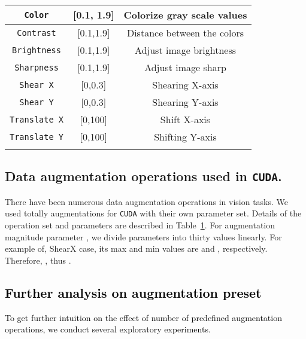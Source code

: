 \documentclass{article}
\def\code#1{\texttt{#1}}
\newcommand{\thickhline}{\hlineB{4}}
\newcommand{\alg}{\code{CUDA}\xspace}
\newcommand{\rebut}[1]{\textcolor{black}{#1}}
\begin{document}
\begin{table}[t!]
{\begin{tabular}{c|c|c}
\code{Color} 
& [0.1, 1.9]
& Colorize gray scale values\\ \hline


\code{Contrast} 
& [0.1,1.9]
& Distance between the colors\\ \hline


\code{Brightness} 
& [0.1,1.9]
& Adjust image brightness\\ \hline


\code{Sharpness} 
& [0.1,1.9]
& Adjust image sharp\\ \hline


\code{Shear X} 
& [0,0.3]
& Shearing X-axis\\ \hline


\code{Shear Y} 
& [0,0.3]
& Shearing Y-axis\\ \hline


\code{Translate X} 
& [0,100]
& Shift X-axis\\ \hline


\code{Translate Y} 
& [0,100]
& Shifting Y-axis\\ \hline


\thickhline
\end{tabular}
}\label{tab:aug_description}
\end{table}
 \subsection{Data augmentation operations used in \alg.}
There have been numerous data augmentation operations in vision tasks. We used totally  augmentations for \alg with their own parameter set. Details of the operation set and parameters are described in Table~\ref{tab:aug_description}.  For augmentation magnitude parameter , we divide parameters into thirty values linearly. For example of, ShearX case, its max and min values are  and , respectively. Therefore, , thus .

\subsection{\rebut{Further analysis on augmentation preset}}
\rebut{To get further intuition on the effect of number of predefined augmentation operations, we conduct several exploratory experiments.}
\end{document}
